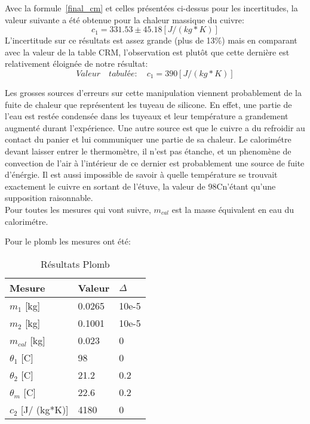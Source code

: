 Avec la formule~\eqref{final_cm} et celles présentées ci-dessus pour les incertitudes, la valeur suivante a été obtenue pour la chaleur massique du cuivre:
\begin{equation}
    c_1=331.53\pm 45.18[J/ (kg*K)]
\end{equation}
L'incertitude sur ce résultats est assez grande (plus de 13\%) mais en comparant avec la valeur de la table CRM, l'observation est plutôt que cette dernière est relativement éloignée de notre résultat:\\
\begin{equation}
    Valeur\quad tabulée:\quad c_1 = 390[J/ (kg*K)]
\end{equation}

Les grosses sources d'erreurs sur cette manipulation viennent probablement de la fuite de chaleur que représentent les tuyeau de silicone. En effet, une partie de l'eau est restée condensée dans les tuyeaux et leur température a grandement augmenté durant l'expérience.
Une autre source est que le cuivre a du refroidir au contact du panier et lui communiquer une partie de sa chaleur.
Le calorimétre devant laisser entrer le thermomètre, il n'est pas étanche, et un phenomène de convection de l'air à l'intérieur de ce dernier est probablement une source de fuite d'énérgie.
Il est aussi impossible de savoir à quelle température se trouvait exactement le cuivre en sortant de l'étuve, la valeur de 98C\degree n'étant qu'une supposition raisonnable.\\
Pour toutes les mesures qui vont suivre, $m_{cal}$ est la masse équivalent en eau du calorimétre.

Pour le plomb les mesures ont été:
\begin{table}[!h]
    \centering
    \caption{Résultats Plomb}
    \begin{tabular}{|l|l|l|}
	\hline
	Mesure	&Valeur	&$\Delta$\\
	\hline
	$m_1$ [kg]	&0.0265	&10e-5\\
	$m_2$ [kg]	&0.1001	&10e-5\\
	$m_{cal}$ [kg]	&0.023	&0\\
	$\theta_1$ [C\degree]	&98	&0\\
	$\theta_2$ [C\degree]	&21.2	&0.2\\
	$\theta_m$ [C\degree]	&22.6	&0.2\\
	$c_2$ [J/ (kg*K)]	&4180	&0\\
	\hline
    \end{tabular}
\end{table}

